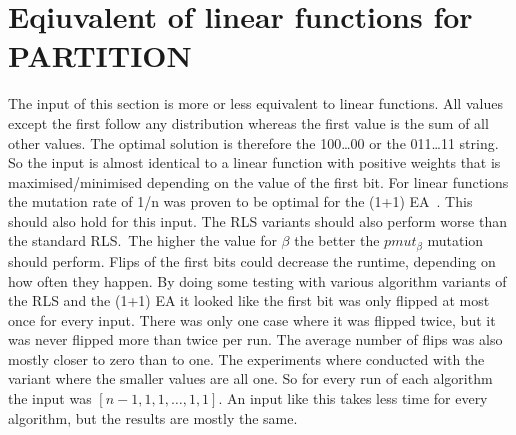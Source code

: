 \section{Eqiuvalent of linear functions for PARTITION}\label{evalSec:onemax}
The input of this section is more or less equivalent to linear functions. All values except the first follow any distribution whereas the first value is the sum of all other values.
The optimal solution is therefore the 100\dots00 or the 011\dots11 string.
So the input is almost identical to a linear function with positive weights that is maximised/minimised depending on the value of the first bit.\newline
For linear functions the mutation rate of 1/n was proven to be optimal for the (1+1) EA~\cite{witt2013tight}.
This should also hold for this input.
The RLS variants should also perform worse than the standard RLS.\
The higher the value for $\beta$ the better the $pmut_\beta$ mutation should perform.
Flips of the first bits could decrease the runtime, depending on how often they happen.
By doing some testing with various algorithm variants of the RLS and the (1+1) EA it looked like the first bit was only flipped at most once for every input.
There was only one case where it was flipped twice, but it was never flipped more than twice per run.
The average number of flips was also mostly closer to zero than to one.\newline
The experiments where conducted with the variant where the smaller values are all one.
So for every run of each algorithm the input was $[n-1, 1, 1, \dots, 1, 1]$.
An input like this takes less time for every algorithm, but the results are mostly the same.
